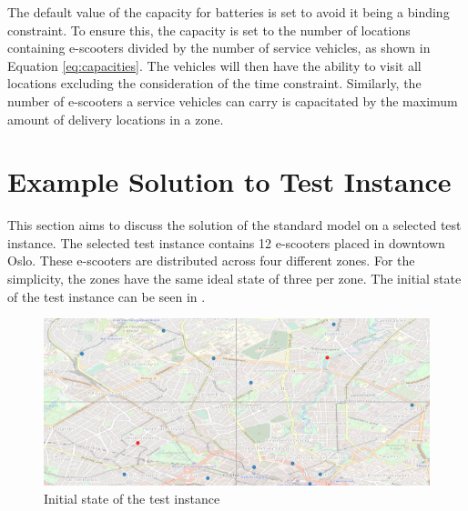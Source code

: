 The default value of the capacity for batteries is set to avoid it being a binding constraint. To ensure this, the capacity is set to the number of locations containing e-scooters divided by the number of service vehicles, as shown in Equation \eqref{eq:capacities}. The vehicles will then have the ability to visit all locations excluding the consideration of the time constraint. Similarly, the number of e-scooters a service vehicles can carry is capacitated by the maximum amount of delivery locations in a zone. 



\section{Example Solution to Test Instance}\label{example_solution}

This section aims to discuss the solution of the standard model on a selected test instance. The selected test instance contains 12 e-scooters placed in downtown Oslo. These e-scooters are distributed across four different zones. For the simplicity, the zones have the same ideal state of three per zone. The initial state of the test instance can be seen in . 
\\
\begin{figure}[h]
    \centering
    \includegraphics[width=15cm]{Images/example_instance.png}
    \caption{Initial state of the test instance}
    \label{fig:example_instance}
\end{figure}
\break

